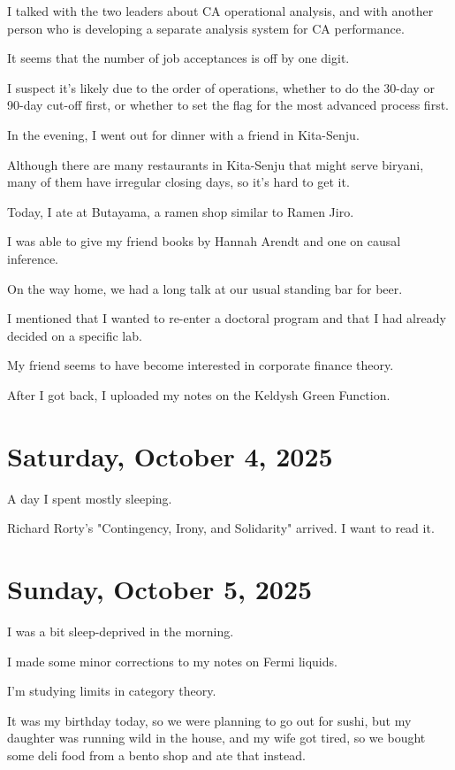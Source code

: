 \documentclass[uplatex]{jsarticle}
\begin{document}
I talked with the two leaders about CA operational analysis, and with another person who is developing a separate analysis system for CA performance.

It seems that the number of job acceptances is off by one digit.

I suspect it's likely due to the order of operations, whether to do the 30-day or 90-day cut-off first, or whether to set the flag for the most advanced process first.

In the evening, I went out for dinner with a friend in Kita-Senju.

Although there are many restaurants in Kita-Senju that might serve biryani, many of them have irregular closing days, so it's hard to get it.

Today, I ate at Butayama, a ramen shop similar to Ramen Jiro.

I was able to give my friend books by Hannah Arendt and one on causal inference.

On the way home, we had a long talk at our usual standing bar for beer.

I mentioned that I wanted to re-enter a doctoral program and that I had already decided on a specific lab.

My friend seems to have become interested in corporate finance theory.

After I got back, I uploaded my notes on the Keldysh Green Function.



\section{Saturday, October 4, 2025}

A day I spent mostly sleeping.

Richard Rorty's "Contingency, Irony, and Solidarity" arrived. I want to read it.



\section{Sunday, October 5, 2025}

I was a bit sleep-deprived in the morning.

I made some minor corrections to my notes on Fermi liquids.

I'm studying limits in category theory.

It was my birthday today, so we were planning to go out for sushi, but my daughter was running wild in the house, and my wife got tired, so we bought some deli food from a bento shop and ate that instead.
\end{document}
